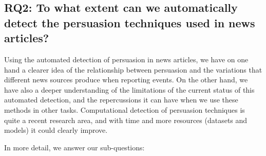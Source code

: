 \subsection*{RQ2: To what extent can we automatically detect the persuasion techniques used in news articles?}

Using the automated detection of persuasion in news articles, we have on one hand a clearer idea of the relationship between persuasion and the variations that different news sources produce when reporting events.
On the other hand, we have also a deeper understanding of the limitations of the current status of this automated detection, and the repercussions it can have when we use these methods in other tasks.
Computational detection of persuasion techniques is quite a recent research area, and with time and more resources (datasets and models) it could clearly improve.

In more detail, we answer our sub-questions:

